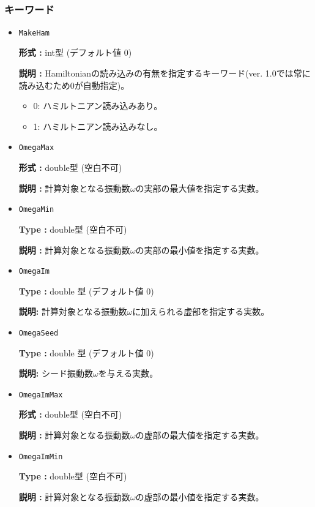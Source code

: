 \documentclass[12pt,titlepage]{jarticle}
\begin{document}
~\subsubsection{キーワード}
 \begin{itemize}
  \item  \verb|MakeHam|

 {\bf 形式 :} int型 (デフォルト値 0)

{\bf 説明 :} 
Hamiltonianの読み込みの有無を指定するキーワード(ver. 1.0では常に読み込むため$0$が自動指定)。
\begin{itemize}
\item{0: ハミルトニアン読み込みあり。}
\item{1: ハミルトニアン読み込みなし。}
\end{itemize}
   
 \item  \verb|OmegaMax|

{\bf 形式 :} double型 (空白不可)

{\bf 説明 :} 計算対象となる振動数$\omega$の実部の最大値を指定する実数。  

\item  \verb|OmegaMin|

{\bf Type :} {double型 (空白不可)}

{\bf 説明 :} 計算対象となる振動数$\omega$の実部の最小値を指定する実数。  

 \item  \verb|OmegaIm|

{\bf Type :} {double 型 (デフォルト値 0)}

{\bf 説明:} {計算対象となる振動数$\omega$に加えられる虚部を指定する実数。}

 \item  \verb|OmegaSeed|

{\bf Type :} {double 型 (デフォルト値 0)}

{\bf 説明:} {シード振動数$\omega$を与える実数。}

 \item  \verb|OmegaImMax|

{\bf 形式 :} double型 (空白不可)

{\bf 説明 :} 計算対象となる振動数$\omega$の虚部の最大値を指定する実数。  

\item  \verb|OmegaImMin|

{\bf Type :} {double型 (空白不可)}

{\bf 説明 :} 計算対象となる振動数$\omega$の虚部の最小値を指定する実数。  



\end{itemize}
\end{document}
